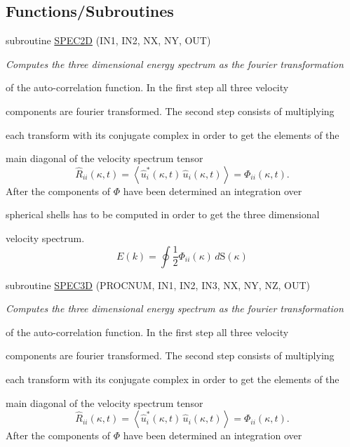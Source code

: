 \subsection*{Functions/Subroutines}
\begin{DoxyCompactItemize}
\item 
subroutine \hyperlink{namespaceSTATISTICS_a4a3e7e4d1eb020e1128c01e60da55ead}{SPEC2D} (IN1, IN2, NX, NY, OUT)
\begin{DoxyCompactList}\small\item\em Computes the three dimensional energy spectrum as the fourier transformation\par
 of the auto-\/correlation function. In the first step all three velocity\par
 components are fourier transformed. The second step consists of multiplying\par
 each transform with its conjugate complex in order to get the elements of the\par
 main diagonal of the velocity spectrum tensor \[\hat{R}_{ii}\left(\kappa,t\right)= \left<\hat{u}_i^{*}\left(\kappa,t\right)\,\hat{u}_i\left(\kappa,t\right)\right>= \Phi_{ii}\left(\kappa,t\right).\] After the components of $\Phi$ have been determined an integration over\par
 spherical shells has to be computed in order to get the three dimensional\par
 velocity spectrum. \[ E(k)=\oint\frac{1}{2}\Phi_{ii}(\kappa)\,d\mathrm{S}(\kappa) \] \end{DoxyCompactList}\item 
subroutine \hyperlink{namespaceSTATISTICS_abb792b2e62e57165b7e93764e07d1100}{SPEC3D} (PROCNUM, IN1, IN2, IN3, NX, NY, NZ, OUT)
\begin{DoxyCompactList}\small\item\em Computes the three dimensional energy spectrum as the fourier transformation\par
 of the auto-\/correlation function. In the first step all three velocity\par
 components are fourier transformed. The second step consists of multiplying\par
 each transform with its conjugate complex in order to get the elements of the\par
 main diagonal of the velocity spectrum tensor \[\hat{R}_{ii}\left(\kappa,t\right)= \left<\hat{u}_i^{*}\left(\kappa,t\right)\,\hat{u}_i\left(\kappa,t\right)\right>= \Phi_{ii}\left(\kappa,t\right).\] After the components of $\Phi$ have been determined an integration over\par

\end{DoxyCompactList}
\end{DoxyCompactItemize}
